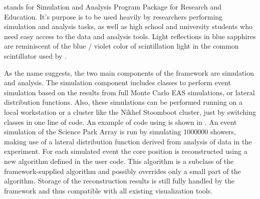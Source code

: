 \sapphire stands for Simulation and Analysis Program Package for \hisparc
Research and Education.  It's purpose is to be used heavily by researchers
performing simulation and analysis tasks, as well as high school and university
students who need easy access to the data and analysis tools.  Light reflections
in blue sapphires are reminiscent of the blue / violet color of scintillation
light in the common scintillator used by \hisparc.

As the name suggests, the two main components of the framework are simulation
and analysis.  The simulation component includes classes to perform event
simulation based on the results from full Monte Carlo EAS simulations, or
lateral distribution functions.  Also, these simulations can be performed
running on a local workstation or a cluster like the Nikhef Stoomboot cluster, just by
switching classes in one line of code.  An example of code using \sapphire is
shown in .  An event simulation of the Science Park
Array is run by simulating \num{1000000} showers, making use of a lateral
distribution function derived from analysis of data in the \kascade experiment.
For each simulated event the core position is reconstructed using a new
algorithm defined in the user code.  This algorithm is a subclass of the
framework-supplied algorithm and possibly overrides only a small part of the
algorithm.  Storage of the reconstruction results is still fully handled by the
framework and thus compatible with all existing visualization tools.

